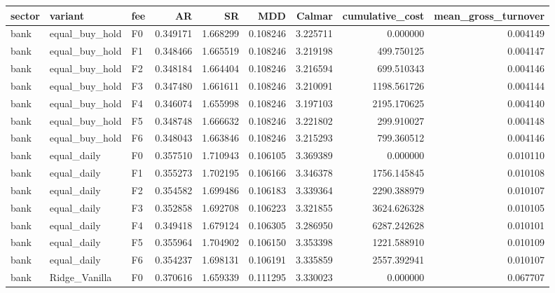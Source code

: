 \begin{tabular}{lllrrrrrr}
\toprule
    sector &        variant & fee &        AR &        SR &      MDD &    Calmar &  cumulative\_cost &  mean\_gross\_turnover \\
\midrule
      bank & equal\_buy\_hold &  F0 &  0.349171 &  1.668299 & 0.108246 &  3.225711 &         0.000000 &             0.004149 \\
      bank & equal\_buy\_hold &  F1 &  0.348466 &  1.665519 & 0.108246 &  3.219198 &       499.750125 &             0.004147 \\
      bank & equal\_buy\_hold &  F2 &  0.348184 &  1.664404 & 0.108246 &  3.216594 &       699.510343 &             0.004146 \\
      bank & equal\_buy\_hold &  F3 &  0.347480 &  1.661611 & 0.108246 &  3.210091 &      1198.561726 &             0.004144 \\
      bank & equal\_buy\_hold &  F4 &  0.346074 &  1.655998 & 0.108246 &  3.197103 &      2195.170625 &             0.004140 \\
      bank & equal\_buy\_hold &  F5 &  0.348748 &  1.666632 & 0.108246 &  3.221802 &       299.910027 &             0.004148 \\
      bank & equal\_buy\_hold &  F6 &  0.348043 &  1.663846 & 0.108246 &  3.215293 &       799.360512 &             0.004146 \\
      bank &    equal\_daily &  F0 &  0.357510 &  1.710943 & 0.106105 &  3.369389 &         0.000000 &             0.010110 \\
      bank &    equal\_daily &  F1 &  0.355273 &  1.702195 & 0.106166 &  3.346378 &      1756.145845 &             0.010108 \\
      bank &    equal\_daily &  F2 &  0.354582 &  1.699486 & 0.106183 &  3.339364 &      2290.388979 &             0.010107 \\
      bank &    equal\_daily &  F3 &  0.352858 &  1.692708 & 0.106223 &  3.321855 &      3624.626328 &             0.010105 \\
      bank &    equal\_daily &  F4 &  0.349418 &  1.679124 & 0.106305 &  3.286950 &      6287.242628 &             0.010101 \\
      bank &    equal\_daily &  F5 &  0.355964 &  1.704902 & 0.106150 &  3.353398 &      1221.588910 &             0.010109 \\
      bank &    equal\_daily &  F6 &  0.354237 &  1.698131 & 0.106191 &  3.335859 &      2557.392941 &             0.010107 \\
      bank &  Ridge\_Vanilla &  F0 &  0.370616 &  1.659339 & 0.111295 &  3.330023 &         0.000000 &             0.067707 \\

\end{tabular}
